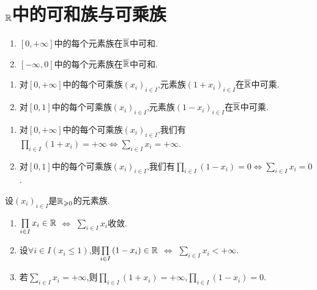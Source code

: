 \section{\texorpdfstring{$\mathbb{R}$}{R}中的可和族与可乘族}

\begin{proposition}{}{}
	\begin{enumerate}
		\item $\left[0,+\infty\right]$中的每个元素族在$\overline{\mathbb{R}}$中可和.
		\item $\left[-\infty,0\right]$中的每个元素族在$\overline{\mathbb{R}}$中可和.
	\end{enumerate}
\end{proposition}

\begin{proposition}{}{}
	\begin{enumerate}
		\item 对$\left[0,+\infty\right]$中的每个可乘族$\left(x_{i}\right)_{i\in I}$,元素族$\left(1+x_{i}\right)_{i\in I}$在$\overline{\mathbb{R}}$中可乘.
		\item 对$\left[0,1\right]$中的每个可乘族$\left(x_{i}\right)_{i\in I}$,元素族$\left(1-x_{i}\right)_{i\in I}$在$\overline{\mathbb{R}}$中可乘.
	\end{enumerate}
\end{proposition}

\begin{corollary}{}{}
	\begin{enumerate}
		\item 对$\left[0,+\infty\right]$中的每个可乘族$\left(x_{i}\right)_{i\in I}$,我们有$\prod\limits_{i\in I}\left(1+x_{i}\right)=+\infty\iff\sum\limits_{i\in I}x_{i}=+\infty$.
		\item 对$\left[0,1\right]$中的每个可乘族$\left(x_{i}\right)_{i\in I}$,我们有$\prod\limits_{i\in I}\left(1-x_{i}\right)=0\iff\sum\limits_{i\in I}x_{i}=0$.
	\end{enumerate}
\end{corollary}

\begin{corollary}{}{}
	设$\left(x_{i}\right)_{i\in I}$是$\mathbb{R}_{\geqslant 0}$的元素族.
	\begin{enumerate}
		\item $\prod\limits_{i\in I}x_{i}\in\mathbb{R}$ $\iff$ $\sum\limits_{i\in I}x_{i}$收敛.
		\item 设$\forall i\in I\left(x_{i}\leqslant 1\right)$,则$\prod\limits_{i\in I}\left(1-x_{i}\right)\in\mathbb{R}$ $\iff$ $\sum\limits_{i\in I}x_{i}<+\infty$.
		\item 若$\sum\limits_{i\in I}x_{i}=+\infty$,则$\prod\limits_{i\in I}\left(1+x_{i}\right)=+\infty$,$\prod\limits_{i\in I}\left(1-x_{i}\right)=0$.
	\end{enumerate}
\end{corollary}

